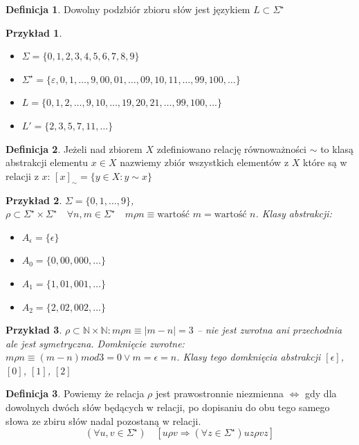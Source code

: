 \documentclass[12pt,a4paper]{article}
\newtheorem{przyklad}{Przykład}
\theoremstyle{definition}
\newtheorem{df}{Definicja}
\theoremstyle{remark}
\begin{document}
	\begin{df}
		Dowolny podzbiór zbioru słów jest językiem $L \subset \Sigma^\star$
	\end{df}

	\begin{przyklad}~\\
		\begin{itemize}
			\item $\Sigma = \{0, 1, 2, 3, 4, 5, 6, 7, 8, 9\}$
			\item $\Sigma^\star = \{\varepsilon, 0, 1, \dots, 9, 00, 01, \dots, 09, 10, 11, \dots, 99, 100, \dots\}$
			\item $L = \{0, 1, 2, \dots, 9, 10, \dots, 19, 20, 21, \dots, 99, 100, \dots \}$
			\item $L' = \{2, 3, 5, 7, 11, \dots \}$
		\end{itemize}
	\end{przyklad}

	\begin{df}
		Jeżeli nad zbiorem $X$ zdefiniowano relację równoważności $\sim$ to klasą abstrakcji elementu $x\in X$ nazwiemy zbiór wszystkich elementów 
		z $X$ które są w relacji z $x$: $[x]_\sim = \{y\in X: y\sim x\}$
	\end{df}		
	
	\begin{przyklad}
		$\Sigma = \{0, 1, \dots, 9\}$, $\rho \subset \Sigma^\star \times \Sigma^\star \quad \forall n,m\in \Sigma^\star \quad m\rho n \equiv
		 \text{wartość } m = \text{wartość } n$. Klasy abstrakcji: \\
		\begin{itemize}
			\item $A_\epsilon = \{\epsilon\}$
			\item $A_0 = \{0, 00, 000, \dots\}$
			\item $A_1 = \{1, 01, 001, \dots\}$
			\item $A_2 = \{2, 02, 002, \dots\}$
		\end{itemize}
	\end{przyklad}		
	
	\begin{przyklad}
		$\rho \subset \mathbb{N} \times \mathbb{N}:  m\rho n \equiv |m-n| = 3$ -- nie jest zwrotna ani przechodnia ale jest symetryczna.
		Domknięcie zwrotne: $m\rho n \equiv (m-n) mod 3 = 0 \vee m = \epsilon = n$. Klasy tego domknięcia abstrakcji $[\epsilon]$, $[0]$, $[1]$, $[2]$
	\end{przyklad}
	
	\begin{df}
		Powiemy że relacja $\rho$ jest prawostronnie niezmienna $\Leftrightarrow$ gdy dla dowolnych dwóch słów będących w relacji, po dopisaniu do obu tego samego słowa ze zbiru słów nadal pozostaną w relacji. 
		$$ (\forall u, v \in \Sigma^\star) \quad[u \rho v \Rightarrow (\forall z\in\Sigma^\star) uz \rho vz] $$
	\end{df}
	
\end{document}
